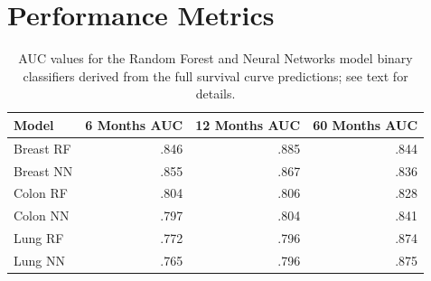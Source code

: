 \documentclass[a4paper,11pt]{article}
\begin{document}
\section{Performance Metrics}
\label{sec:performancemetrics}



\begin{table}[tbp]
\begin{center}
\begin{tabular}{lrrr}
\toprule
Model & 6 Months AUC & 12 Months AUC & 60 Months AUC \\ 
\midrule
Breast RF &  .846       &     .885           &  .844 \\ 
Breast NN &   .855      &     .867      &    .836 \\ 
Colon RF  &     .804          &      .806           &      .828           \\ 
Colon NN   &     .797          &          .804         &   .841  \\ 
Lung RF    &      .772               &        .796               &   .874  \\ 
Lung NN    &        .765              &        .796               &  .875  \\
\bottomrule
\end{tabular}
\caption{\label{tab:AUC} AUC values for the Random Forest and Neural Networks model
binary classifiers derived from the full survival curve predictions; see text for details.}
\end{center}
\end{table}
\end{document}
